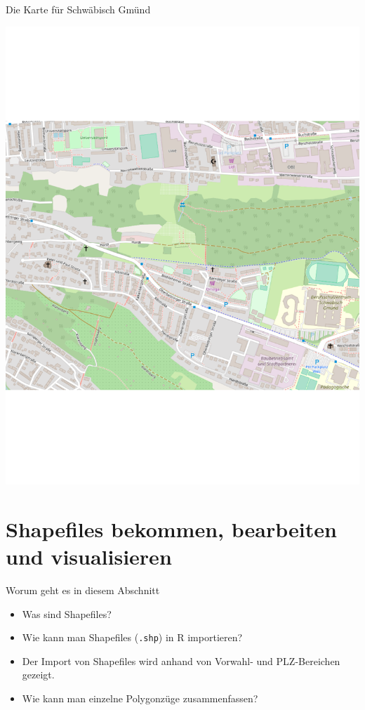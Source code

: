 \documentclass[ignorenonframetext,]{beamer}
\providecommand{\tightlist}{%
  \setlength{\itemsep}{0pt}\setlength{\parskip}{0pt}}
\begin{document}
\begin{frame}{Die Karte für Schwäbisch Gmünd}

\includegraphics{figure/PH_SG.pdf}

\end{frame}

\section{Shapefiles bekommen, bearbeiten und
visualisieren}\label{shapefiles-bekommen-bearbeiten-und-visualisieren}

\begin{frame}[fragile]{Worum geht es in diesem Abschnitt}

\begin{itemize}
\tightlist
\item
  Was sind Shapefiles?
\item
  Wie kann man Shapefiles (\texttt{.shp}) in R importieren?
\item
  Der Import von Shapefiles wird anhand von Vorwahl- und PLZ-Bereichen
  gezeigt.
\item
  Wie kann man einzelne Polygonzüge zusammenfassen?
\end{itemize}

\end{frame}
\end{document}
